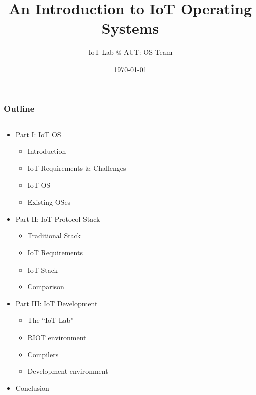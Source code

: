 \documentclass{beamer}
\title[Operating Systems of the IoT]{An Introduction to IoT Operating Systems}
\author{IoT Lab @ AUT: OS Team}
\institute[] {
  Amirkabir University of Technology \\
  \medskip
  {\small\tt elahejalalpoor@gmail.com}\\
  {\small\tt parham.alvani@gmail.com}
  \medskip
}
\date{\today}
\begin{document}
\begin{frame}
\titlepage
\end{frame}


\begin{frame}
	\frametitle{Outline}
	\begin{columns}[c]
		\begin{column}{30cm}
			\vspace{.1cm}
			\begin{itemize}
				\justifying
				\item Part I: IoT OS
				\begin{itemize}
					\item<2-> Introduction
					\item<2-> IoT Requirements \& Challenges
					\item<2-> IoT OS
					\item<2-> Existing OSes				
				\end{itemize}
				\item Part II: IoT Protocol Stack
				\begin{itemize}
					\item<3-> Traditional Stack
					\item<3-> IoT Requirements
					\item<3-> IoT Stack
					\item<3-> Comparison
				\end{itemize}
				\item Part III: IoT Development
				\begin{itemize}
					\item<4-> The ``IoT-Lab''
					\item<4-> RIOT environment
					\item<4-> Compilers
					\item<4-> Development environment
				\end{itemize}
				\item Conclusion
			\end{itemize}
		\end{column}
	\end{columns}
\end{frame}
\end{document}
